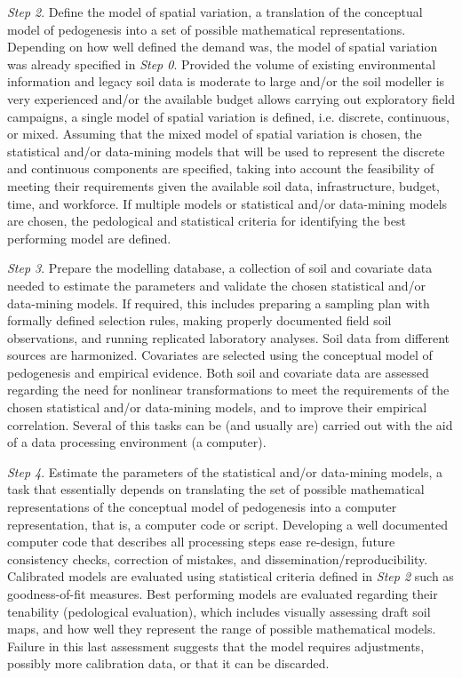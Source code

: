 \noindent\textit{Step 2}. Define the model of spatial variation, a translation of the conceptual
model of pedogenesis into a set of possible mathematical representations. Depending on
how well defined the demand was, the model of spatial variation was already specified in
\textit{Step 0}. Provided the volume of existing environmental information and legacy soil data is
moderate to large and/or the soil modeller is very experienced and/or the available budget
allows carrying out exploratory field campaigns, a single model of spatial variation is
defined, i.e. discrete, continuous, or mixed. Assuming that the mixed model of spatial variation is
chosen, the statistical and/or data-mining models that will be used to represent the discrete
and continuous components are specified, taking into account the feasibility of meeting their
requirements given the available soil data, infrastructure, budget, time, and workforce. If multiple
models or statistical and/or data-mining models are chosen, the pedological and
statistical criteria for identifying the best performing model are defined.

\noindent\textit{Step 3}. Prepare the modelling database, a collection of soil and covariate data
needed to estimate the parameters and validate the chosen statistical and/or data-mining
models. If required, this includes preparing a sampling plan with formally defined selection rules,
making properly documented field soil observations, and running replicated laboratory analyses.
Soil data from different sources are harmonized. Covariates are selected using the conceptual model
of pedogenesis and empirical evidence. Both soil and covariate data are assessed regarding the need
for nonlinear transformations to meet the requirements of the chosen statistical and/or
data-mining models, and to improve their empirical correlation. Several of this tasks can be (and
usually are) carried out with the aid of a data processing environment (a computer).

\noindent\textit{Step 4}. Estimate the parameters of the statistical and/or data-mining
models, a task that essentially depends on translating the set of possible mathematical
representations of the conceptual model of pedogenesis into a computer representation, that is, a
computer code or script. Developing a well documented computer code that describes all processing
steps ease re-design, future consistency checks, correction of mistakes, and
dissemination/reproducibility. Calibrated models are evaluated using statistical criteria defined in
\textit{Step 2} such as goodness-of-fit measures. Best performing models are evaluated regarding their
tenability (pedological evaluation), which includes visually assessing draft soil maps, and how well
they represent the range of possible mathematical models. Failure in this last assessment suggests
that the model requires adjustments, possibly more calibration data, or that it can be discarded.

